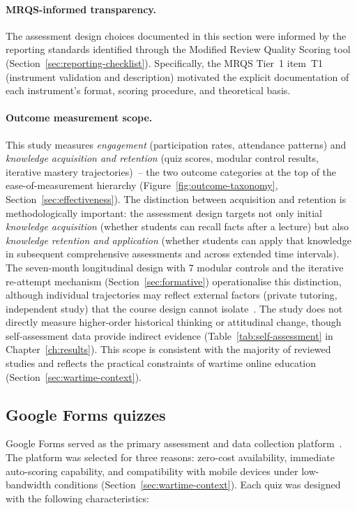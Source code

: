 \paragraph{MRQS-informed transparency.}
The assessment design choices documented in this section were informed by the reporting standards identified through the Modified Review Quality Scoring tool (Section~\ref{sec:reporting-checklist}). Specifically, the MRQS Tier~1 item~T1 (instrument validation and description) motivated the explicit documentation of each instrument's format, scoring procedure, and theoretical basis.

\paragraph{Outcome measurement scope.}
This study measures \emph{engagement} (participation rates, attendance patterns) and \emph{knowledge acquisition and retention} (quiz scores, modular control results, iterative mastery trajectories)~-- the two outcome categories at the top of the ease-of-measurement hierarchy (Figure~\ref{fig:outcome-taxonomy}, Section~\ref{sec:effectiveness}). The distinction between acquisition and retention is methodologically important: the assessment design targets not only initial \textit{knowledge acquisition} (whether students can recall facts after a lecture) but also \textit{knowledge retention and application} (whether students can apply that knowledge in subsequent comprehensive assessments and across extended time intervals). The seven-month longitudinal design with 7 modular controls and the iterative re-attempt mechanism (Section~\ref{sec:formative}) operationalise this distinction, although individual trajectories may reflect external factors (private tutoring, independent study) that the course design cannot isolate~\cite{RoedigerButler2011, Dunlosky2013}. The study does not directly measure higher-order historical thinking or attitudinal change, though self-assessment data provide indirect evidence (Table~\ref{tab:self-assessment} in Chapter~\ref{ch:results}). This scope is consistent with the majority of reviewed studies and reflects the practical constraints of wartime online education (Section~\ref{sec:wartime-context}).

\subsection{Google Forms quizzes}

Google Forms served as the primary assessment and data collection platform~\cite{UNESCO2023, Hlianenko2024}. The platform was selected for three reasons: zero-cost availability, immediate auto-scoring capability, and compatibility with mobile devices under low-bandwidth conditions (Section~\ref{sec:wartime-context}). Each quiz was designed with the following characteristics:

